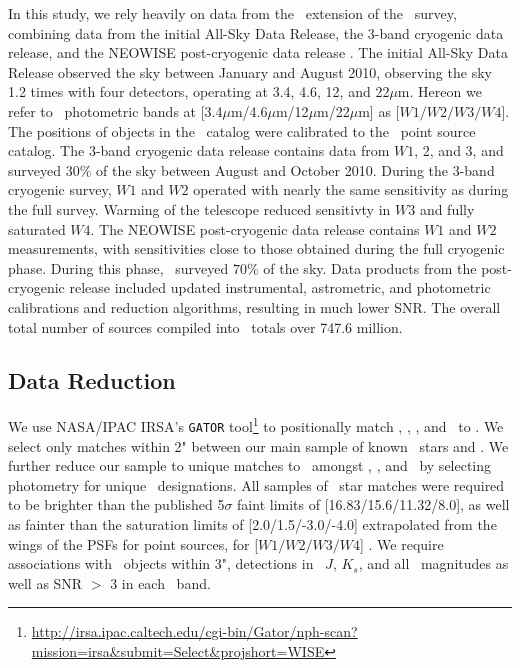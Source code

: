 In this study, we rely heavily on data from the \allwise\, extension of the \wise\, survey, combining data from the initial All-Sky Data Release, the 3-band cryogenic data release, and the NEOWISE post-cryogenic data release \citep{2013wise.rept....1C}. The initial \wise All-Sky Data Release observed the sky between January and August 2010, observing the sky 1.2 times with four detectors, operating at 3.4, 4.6, 12, and 22$\mu$m. Hereon we refer to \allwise\, photometric bands at [3.4$\mu$m/4.6$\mu$m/12$\mu$m/22$\mu$m] as [$W1/W2/W3/W4$]. The positions of objects in the \wise\, catalog were calibrated to the \twomass\, point source catalog. The 3-band cryogenic data release contains data from $W1$, 2, and 3, and surveyed $30\%$ of the sky between August and October 2010. During the 3-band cryogenic survey, $W1$ and $W2$ operated with nearly the same sensitivity as during the full survey. Warming of the telescope reduced sensitivty in $W3$ and fully saturated $W4$. The NEOWISE post-cryogenic data release contains $W1$ and $W2$ measurements, with sensitivities close to those obtained during the full cryogenic phase. During this phase, \wise\, surveyed $70\%$ of the sky. Data products from the post-cryogenic release included updated instrumental, astrometric, and photometric calibrations and reduction algorithms, resulting in much lower SNR. The overall total number of sources compiled into \allwise\, totals over 747.6 million.

\subsection{Data Reduction}
We use NASA/IPAC IRSA's {\tt GATOR} tool\footnote{\url{http://irsa.ipac.caltech.edu/cgi-bin/Gator/nph-scan?mission=irsa&submit=Select&projshort=WISE}} to positionally match \sdss, \ogle, \macho, and \simbad\, to \allwise. We select only matches within 2" between our main sample of known \agb\, stars and \allwise. We further reduce our sample to unique matches to \allwise\, amongst \ogle, \macho, and \simbad\, by selecting \allwise\, photometry for unique \allwise\, designations. All samples of \agb\, star matches were required to be brighter than the published 5$\sigma$ faint limits of [16.83/15.6/11.32/8.0], as well as fainter than the saturation limits of [2.0/1.5/-3.0/-4.0] extrapolated from the wings of the PSFs for point sources, for [$W1/W2/W3/W4$] \citep{2013wise.rept....1C}. We require associations with \twomass\, objects within 3", detections in \twomass\, $J$, $K_s$, and all \allwise\, magnitudes as well as SNR $>$ 3 in each \allwise\, band. 

